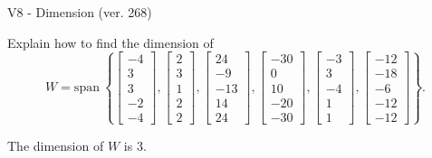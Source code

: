 \begin{exercise}
  \begin{exerciseTitle}V8 - Dimension (ver. 268)\end{exerciseTitle}
  \begin{exerciseStatement}
    Explain how to find the dimension of 
\[W=\mathrm{span}\ \left\{\left[\begin{array}{r}
-4 \\
3 \\
3 \\
-2 \\
-4
\end{array}\right] , \left[\begin{array}{r}
2 \\
3 \\
1 \\
2 \\
2
\end{array}\right] , \left[\begin{array}{r}
24 \\
-9 \\
-13 \\
14 \\
24
\end{array}\right] , \left[\begin{array}{r}
-30 \\
0 \\
10 \\
-20 \\
-30
\end{array}\right] , \left[\begin{array}{r}
-3 \\
3 \\
-4 \\
1 \\
1
\end{array}\right] , \left[\begin{array}{r}
-12 \\
-18 \\
-6 \\
-12 \\
-12
\end{array}\right]\right\}.\]



  \end{exerciseStatement}
  \begin{exerciseAnswer}
   The dimension of \(W\) is  \(3\).
  


  \end{exerciseAnswer}
\end{exercise}